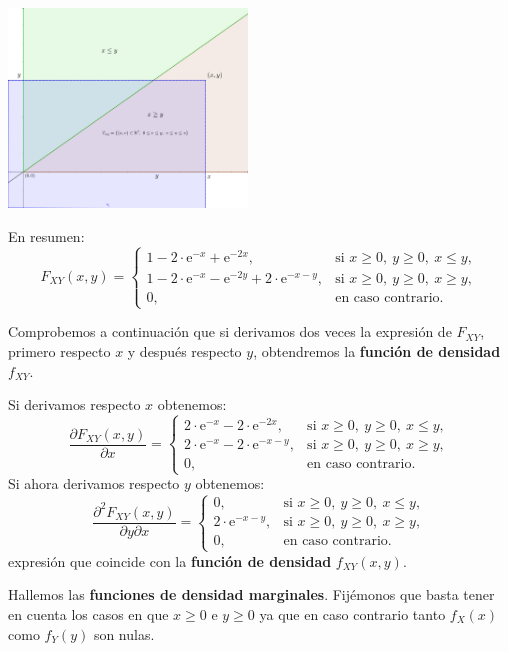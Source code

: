\documentclass[
  letterpaper,
  DIV=11,
  numbers=noendperiod]{scrreprt}
\begin{document}
\includegraphics[width=2.5in,height=\textheight]{Images/Ejemplo2Bidi4.png}

En resumen: \[
F_{XY}(x,y)=\begin{cases}
1-2\cdot\mathrm{e}^{-x}+\mathrm{e}^{-2x}, & \mbox{si }x\geq 0,\ y\geq 0,\ x\leq y,\\
1-2\cdot\mathrm{e}^{-x}-\mathrm{e}^{-2y}+2\cdot\mathrm{e}^{-x-y}, & \mbox{si }x\geq 0,\ y\geq 0,\ x\geq y,\\
0, & \mbox{en caso contrario.}
\end{cases}
\]

Comprobemos a continuación que si derivamos dos veces la expresión de
\(F_{XY}\), primero respecto \(x\) y después respecto \(y\), obtendremos
la \textbf{función de densidad} \(f_{XY}\).

Si derivamos respecto \(x\) obtenemos: \[
\frac{\partial F_{XY}(x,y)}{\partial x}=\begin{cases}
2\cdot\mathrm{e}^{-x}-2\cdot\mathrm{e}^{-2x}, & \mbox{si }x\geq 0,\ y\geq 0,\ x\leq y,\\
2\cdot\mathrm{e}^{-x}-2\cdot\mathrm{e}^{-x-y}, & \mbox{si }x\geq 0,\ y\geq 0,\ x\geq y,\\
0, & \mbox{en caso contrario.}
\end{cases}
\] Si ahora derivamos respecto \(y\) obtenemos: \[
\frac{\partial^2 F_{XY}(x,y)}{\partial y\partial x}=\begin{cases}
0, & \mbox{si }x\geq 0,\ y\geq 0,\ x\leq y,\\
2\cdot\mathrm{e}^{-x-y}, & \mbox{si }x\geq 0,\ y\geq 0,\ x\geq y,\\
0, & \mbox{en caso contrario.}
\end{cases}
\] expresión que coincide con la \textbf{función de densidad}
\(f_{XY}(x,y)\).

Hallemos las \textbf{funciones de densidad marginales}. Fijémonos que
basta tener en cuenta los casos en que \(x\geq 0\) e \(y\geq 0\) ya que
en caso contrario tanto \(f_X(x)\) como \(f_Y(y)\) son nulas.
\end{document}
